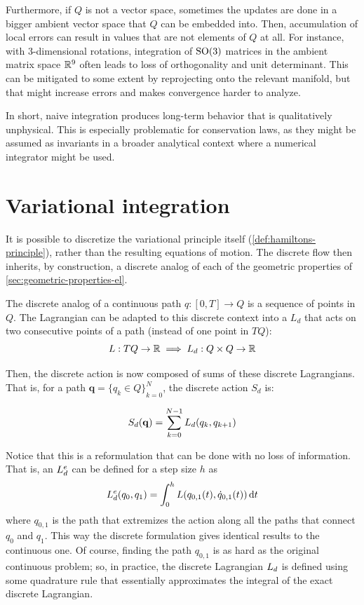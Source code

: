 Furthermore, if $Q$ is not a vector space, sometimes the updates are done in a bigger ambient vector space that $Q$ can be embedded into. Then, accumulation of local errors can result in values that are not elements of $Q$ at all. For instance, with 3-dimensional rotations, integration of $\mathrm{SO}(3)$ matrices in the ambient matrix space ${\mathbb{R}}^9$ often leads to loss of orthogonality and unit determinant. This can be mitigated to some extent by reprojecting onto the relevant manifold, but that might increase errors and makes convergence harder to analyze.

In short, naive integration produces long-term behavior that is qualitatively unphysical. This is especially problematic for conservation laws, as they might be assumed as invariants in a broader analytical context where a numerical integrator might be used. 


\section{Variational integration}\label{sec:variational-integration}

It is possible to discretize the variational principle itself (\cref{def:hamiltons-principle}), rather than the resulting equations of motion. The discrete flow then inherits, by construction, a discrete analog of each of the geometric properties of \cref{sec:geometric-properties-el}.

\bigskip

The discrete analog of a continuous path $q : [0, T] \to Q$ is a sequence of points in $Q$. The Lagrangian can be adapted to this discrete context into a  $L_d$ that acts on two consecutive points of a path (instead of one point in $TQ$):
\[ L: TQ \to {\mathbb{R}} \implies L_d : Q \times Q \to {\mathbb{R}} \]

Then, the discrete action is now composed of sums of these discrete Lagrangians. That is, for a path $\mathbf{q} = {\{ q_k \in Q \}}_{k=0}^N$, the discrete action $S_d$ is:

\begin{equation}
	S_d (\mathbf{q}) = \sum_{k=0}^{N-1} L_d(q_k, q_{k+1})
	\label{eq:action-discrete}
\end{equation}

Notice that this is a reformulation that can be done with no loss of information. That is, an  $L_d^e$ can be defined for a step size $h$ as
\begin{equation}
	L_d^e (q_0, q_1) = \int_0^h L(q_{0, 1}(t), \dot{q}_{0, 1}(t)) \odif{t}
\end{equation}
where $q_{0, 1}$ is the path that extremizes the action along all the paths that connect $q_0$ and $q_1$. This way the discrete formulation gives identical results to the continuous one. Of course, finding the path $q_{0,1}$ is as hard as the original continuous problem; so, in practice, the discrete Lagrangian $L_d$ is defined using some quadrature rule that essentially approximates the integral of the exact discrete Lagrangian.

